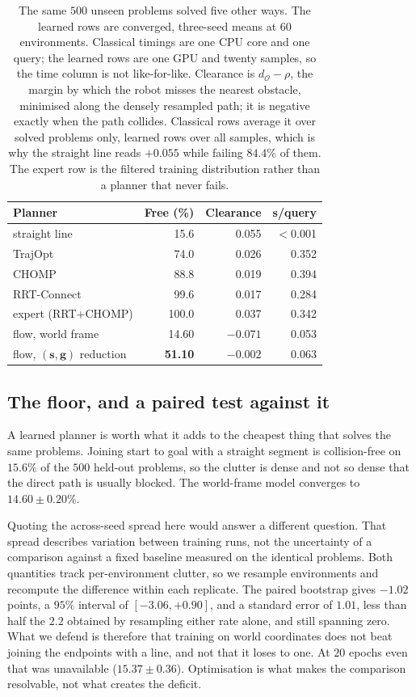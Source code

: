 \documentclass[conference]{IEEEtran}
\newcommand{\svec}{\mathbf{s}}
\newcommand{\gvec}{\mathbf{g}}
\begin{document}
\begin{table}[t]
\centering
\footnotesize
\setlength{\tabcolsep}{3.5pt}
\begin{tabular}{@{}lrrr@{}}
\toprule
Planner & Free (\%) & Clearance & s/query \\
\midrule
straight line                   & 15.6 & 0.055 & $<$0.001 \\
TrajOpt                         & 74.0 & 0.026 & 0.352 \\
CHOMP                           & 88.8 & 0.019 & 0.394 \\
RRT-Connect                     & 99.6 & 0.017 & 0.284 \\
expert (RRT+CHOMP)              & 100.0 & 0.037 & 0.342 \\
\midrule
flow, world frame               & 14.60 & $-0.071$ & 0.053 \\
flow, $(\svec,\gvec)$ reduction & \textbf{51.10} & $-0.002$ & 0.063 \\
\bottomrule
\end{tabular}
\caption{The same $500$ unseen problems solved five other ways. The learned rows
are converged, three-seed means at $60$ environments. Classical timings are one
CPU core and one query; the learned rows are one GPU and twenty samples, so the
time column is not like-for-like. Clearance is $d_{\mathcal{O}} - \rho$, the
margin by which the robot misses the nearest obstacle, minimised along the
densely resampled path; it is negative exactly when the path collides. Classical
rows average it over solved problems only, learned rows over all samples, which
is why the straight line reads $+0.055$ while failing $84.4\%$ of them. The
expert row is the filtered training distribution rather than a planner that never
fails.}
\label{tab:floors}
\end{table}

\subsection{The floor, and a paired test against it}
A learned planner is worth what it adds to the cheapest thing that solves the
same problems. Joining start to goal with a straight segment is collision-free on
$15.6\%$ of the $500$ held-out problems, so the clutter is dense and not so dense
that the direct path is usually blocked. The world-frame model converges to
$14.60 \pm 0.20\%$.

Quoting the across-seed spread here would answer a different question. That
spread describes variation between training runs, not the uncertainty of a
comparison against a fixed baseline measured on the identical problems. Both
quantities track per-environment clutter, so we resample environments and
recompute the difference within each replicate. The paired bootstrap gives
$-1.02$ points, a $95\%$ interval of $[-3.06, +0.90]$, and a standard error of
$1.01$, less than half the $2.2$ obtained by resampling either rate alone, and
still spanning zero. What we defend is therefore that training on world
coordinates does not beat joining the endpoints with a line, and not that it
loses to one. At $20$ epochs even that was unavailable ($15.37 \pm 0.36$).
Optimisation is what makes the comparison resolvable, not what creates the
deficit.
\end{document}
